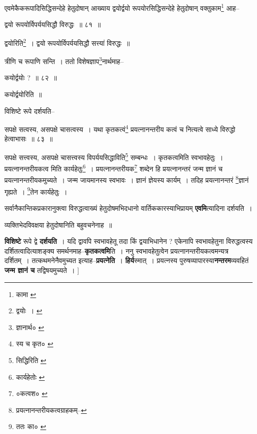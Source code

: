 \documentclass[article,12pt,a4paper]{memoir}
\begin{document}
	  \pstart एवमेकैकरूपादिसिद्धिसन्देहे हेतुदोषान् आख्याय द्वयोर्द्वयो रूपयोरसिद्धिसन्देहे हेतुदोषान् वक्तुकाम\footnote{कामा \cite{dp-msC}} आह--
	\pend
       
	  \bigskip
	  \begingroup
	

	  \pstart द्वयो रूपयोर्विपर्ययसिद्धौ विरुद्धः ॥ ८१ ॥
	\pend
      
	  \endgroup
	 

	  \pstart द्वयोरिति\footnote{द्वयोः । \cite{dp-msD}} । द्वयो रूपयोर्विपर्ययसिद्धौ सत्त्यां विरुद्धः ॥
	\pend
       

	  \pstart त्रीणि च रूपाणि सन्ति । ततो विशेषज्ञाप\footnote{ज्ञानार्थ० \cite{dp-msC}}\-नार्थमाह--
	\pend
       
	  \bigskip
	  \begingroup
	

	  \pstart कयोर्द्वयोः ? ॥ ८२ ॥
	\pend
      
	  \endgroup
	 

	  \pstart कयोर्द्वयोरिति ॥
	\pend
       

	  \pstart विशिष्टे रूपे दर्शयति--
	\pend
       
	  \bigskip
	  \begingroup
	

	  \pstart सपक्षे सत्वस्य, असपक्षे चासत्वस्य । यथा कृतकत्वं\footnote{स्य च कृत० \cite{dp-msC}} प्रयत्नानन्तरीय कत्वं च नित्यत्वे साध्ये विरुद्धो हेत्वाभासः ॥ ८३ ॥
	\pend
      
	  \endgroup
	 

	  \pstart सपक्षे सत्त्वस्य, असपक्षे चासत्त्वस्य विपर्ययसिद्धाविति\footnote{सिद्धिरिति \cite{dp-msC}} सम्बन्धः । कृतकत्वमिति स्वभावहेतुः । प्रयत्नानन्तरीयकत्व मिति कार्यहेतुः\footnote{कार्यहेतोः \cite{dp-edH}} । प्रयत्नानन्तरीयक\footnote{०कत्वश० \cite{dp-msC}} शब्देन हि प्रयत्नानन्तरं जन्म ज्ञानं च प्रयत्नानन्तरीयकमुच्यते । जन्म जायमानस्य स्वभावः । ज्ञानं ज्ञेयस्य कार्यम् । तदिह प्रयत्नानन्तरं \footnote{प्रयत्नानन्तरीयकत्वग्राहकम्--\cite{dp-msD-n}}\-ज्ञानं गृह्यते । \footnote{ततः का० \cite{dp-msC} \cite{dp-msD}}\-तेन कार्यहेतुः ।
	\pend
      
	  \endgroup
	

	  \pstart सर्वानैकान्तिकप्रकारानुक्त्वा विरुद्धत्वाख्यं हेतुदोषमभिदधानो वार्तिककारस्याभिप्रायम् \textbf{एवमि}त्यादिना दर्शयति ।
	\pend
      

	  \pstart व्यक्तिभेदविवक्षया हेतुदोषानिति बहुवचनेनाह ॥
	\pend
      

	  \pstart \textbf{विशिष्टे} रूपे द्वे \textbf{दर्शयति} । यदि द्वावपि स्वभावहेतू तदा किं द्वयाभिधानेन ? एकेनापि स्वभावहेतुना विरुद्धत्वस्य दर्शितत्वादित्याशङ्क्य समर्थनमाह--\textbf{कृतकत्वमि}ति । ननु स्वभावहेतुत्वेन प्रयत्नानन्तरीयकत्वमन्यत्र दर्शितम् । तत्कथमनेनैवमुच्यत इत्याह--\textbf{प्रयत्नेति} । \textbf{हिर्य}स्मात् । प्रयत्नस्य पुरुषव्यापारस्या\textbf{नन्तरम}व्यवहितं \textbf{जन्म ज्ञानं च} तद्विषयमुच्यते ।
	\pend
      [[चेति \cite{dp-msC}]]
	  \bigskip
	  \begingroup
	
\end{document}
